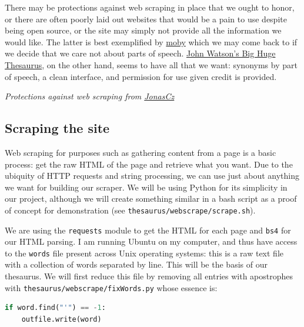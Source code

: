 \documentclass[11pt, twoside, reqno]{book}
\begin{document}
There may be protections against web scraping in place that we ought to honor, or there are often poorly laid out websites that would be a pain to use despite being open source, or the site may simply not provide all the information we would like. The latter is best exemplified by \href{http://moby-thesaurus.org}{moby} which we may come back to if we decide that we care not about parts of speech. \href{https://words.bighugelabs.com}{John Watson's Big Huge Thesaurus}, on the other hand, seems to have all that we want: synonyms by part of speech, a clean interface, and permission for use given credit is provided.

\textit{Protections against web scraping from \href{https://github.com/JonasCz/How-To-Prevent-Scraping/blob/master/README.md}{JonasCz}}

\subsection{Scraping the site}

Web scraping for purposes such as gathering content from a page is a basic process: get the raw HTML of the page and retrieve what you want. Due to the ubiquity of HTTP requests and string processing, we can use just about anything we want for building our scraper. We will be using Python for its simplicity in our project, although we will create something similar in a bash script as a proof of concept for demonstration (see \texttt{thesaurus/webscrape/scrape.sh}).


We are using the \texttt{requests} module to get the HTML for each page and \texttt{bs4} for our HTML parsing. I am running Ubuntu on my computer, and thus have access to the \texttt{words} file present across Unix operating systems: this is a raw text file with a collection of words separated by line. This will be the basis of our thesaurus. We will first reduce this file by removing all entries with apostrophes with \texttt{thesaurus/webscrape/fixWords.py} whose essence is:
\begin{lstlisting}[language=Python]
if word.find("'") == -1:
    outfile.write(word)
\end{lstlisting}
\end{document}
